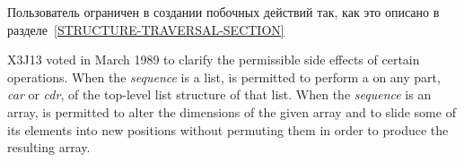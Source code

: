\begin{defun}[Функция]
Пользователь ограничен в создании побочных действий так, как это описано в
разделе~\ref{STRUCTURE-TRAVERSAL-SECTION}

\begin{newer}
X3J13 voted in March 1989 
to clarify the permissible side effects of certain operations.
When the \emph{sequence} is a list,
 is permitted to perform a  on any part,
\emph{car} or \emph{cdr}, of the top-level list structure of that list.
When the \emph{sequence} is an array,
 is permitted to alter the dimensions of the given array
and to slide some of its elements into new positions without permuting them
in order to produce the resulting array.
\end{newer}
\end{defun}

